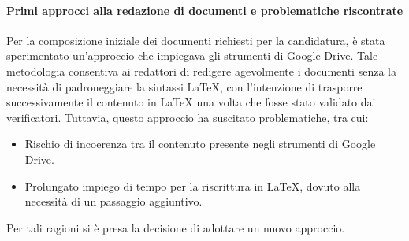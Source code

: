 \documentclass{article}
\begin{document}
    \paragraph{Primi approcci alla redazione di documenti e problematiche riscontrate}
    Per la composizione iniziale dei documenti richiesti per la candidatura, è stata sperimentato un'approccio che impiegava gli strumenti di Google Drive. Tale metodologia consentiva ai redattori di redigere agevolmente i documenti senza la necessità di padroneggiare la sintassi LaTeX, con l'intenzione di trasporre successivamente il contenuto in LaTeX una volta che fosse stato validato dai verificatori. Tuttavia, questo approccio ha suscitato problematiche, tra cui:
    \begin{itemize}
        \item Rischio di incoerenza tra il contenuto presente negli strumenti di Google Drive.
        \item Prolungato impiego di tempo per la riscrittura in LaTeX, dovuto alla necessità di un passaggio aggiuntivo. 
    \end{itemize}
    Per tali ragioni si è presa la decisione di adottare un nuovo approccio.
\end{document}
